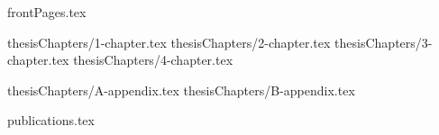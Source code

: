 \documentclass[a4paper,12pt,oneside,openany]{book}
\begin{document}
 {frontPages.tex}

 {thesisChapters/1-chapter.tex}
 {thesisChapters/2-chapter.tex}
 {thesisChapters/3-chapter.tex}
 {thesisChapters/4-chapter.tex}


\newpage\appendix

 {thesisChapters/A-appendix.tex}
 {thesisChapters/B-appendix.tex}


\newpage
{}
\singlespacing
\printbibliography[title={\bibName}]

\ifnum{}
\newpage
{}
 {publications.tex}
\fi
\end{document}
